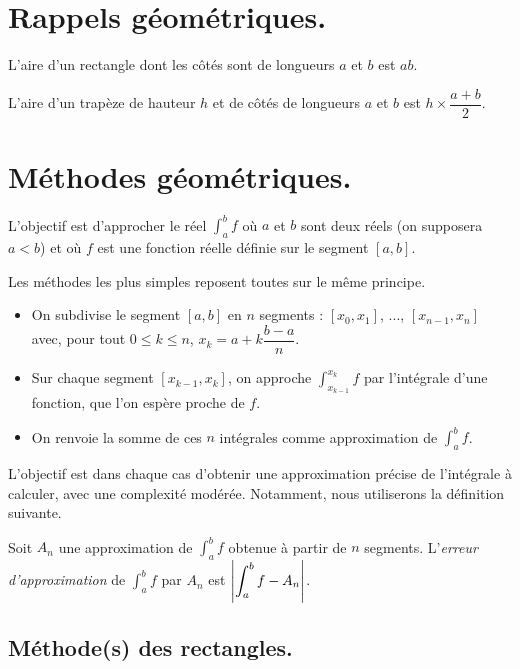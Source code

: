 \section{Rappels géométriques.}

\begin{prop} 
  L'aire d'un rectangle dont les côtés sont de longueurs $a$ et $b$ est $ab$. 
\end{prop}

\begin{prop}
  L'aire d'un trapèze de hauteur $h$ et de côtés de longueurs $a$ et $b$ est $h\times \dfrac{a+b}{2}$.
\end{prop}



\section{Méthodes géométriques.}

L'objectif est d'approcher le réel $  \int_a^b f$ où $a$ et $b$ sont deux réels (on supposera $a<b$) et où $f$ est une fonction réelle définie sur le segment $[a,b]$.

Les méthodes les plus simples reposent toutes sur le même principe. 
\begin{itemize}
  \item On subdivise le segment $[a,b]$ en $n$ segments : $[x_0,x_1]$, ..., $[x_{n-1},x_n]$ avec, pour tout $0 \leq k \leq n$, $x_k = a + k\dfrac{b-a}{n}$.
  \item Sur chaque segment $[x_{k-1},x_{k}]$, on approche $\displaystyle\int_{x_{k-1}}^{x_{k}} f$ par l'intégrale d'une fonction, que l'on espère proche de $f$. 
  \item On renvoie la somme de ces $n$ intégrales comme approximation de $\displaystyle\int_a^b f$.
\end{itemize}

L'objectif est dans chaque cas d'obtenir une approximation précise de l'intégrale à calculer, avec une complexité modérée. Notamment, nous utiliserons la définition suivante. 

\begin{defi}
  Soit $A_n$ une approximation de $\displaystyle\int_a^b f$ obtenue à partir de $n$ segments. L'\emph{erreur d'approximation} de $\displaystyle\int_a^b f$ par $A_n$ est $    \left|\displaystyle\int_a^b f - A_n\right|$.
\end{defi}


\subsection{Méthode(s) des rectangles.}

